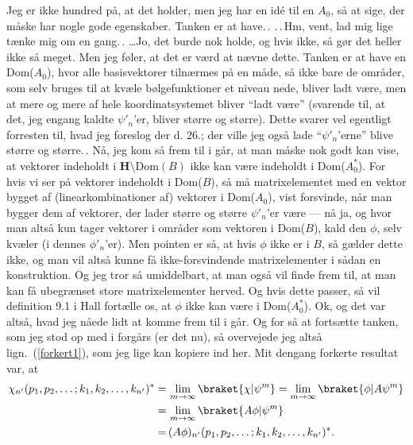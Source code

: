 \documentclass{report}
\begin{document}
Jeg er ikke hundred på, at det holder, men jeg har en idé til en $A_0$, så at sige, der måske har nogle gode egenskaber. Tanken er at have.\,. .\,.\,Hm, vent, lad mig lige tænke mig om en gang.\,. \ldots Jo, det burde nok holde, og hvis ikke, så gør det heller ikke så meget. Men jeg føler, at det er værd at nævne dette. Tanken er at have en Dom($A_0$), hvor alle basisvektorer tilnærmes på en måde, så ikke bare de områder, som selv bruges til at kvæle bølgefunktioner et niveau nede, bliver ladt være, men at mere og mere af hele koordinatsystemet bliver ``ladt være'' (svarende til, at det, jeg engang kaldte $\psi'_n$'er, bliver større og større). Dette svarer vel egentligt forresten til, hvad jeg foreslog der d. 26.; der ville jeg også lade ``$\psi'_n$'erne'' blive større og større.\,. Nå, jeg kom så frem til i går, at man måske nok godt kan vise, at vektorer indeholdt i $\mathrm{\textbf{H}} \setminus \mathrm{Dom}(B)$ ikke kan være indeholdt i Dom($A_0^*$). For hvis vi ser på vektorer indeholdt i Dom($B$), så må matrixelementet med en vektor bygget af (linearkombinationer af) vektorer i Dom($A_0$), vist forsvinde, når man bygger dem af vektorer, der lader større og større $\psi'_n$'er være --- nå ja, og hvor man altså kun tager vektorer i områder som vektoren i Dom($B$), kald den $\phi$, selv kvæler (i dennes $\phi'_n$'er). Men pointen er så, at hvis $\phi$ ikke er i $B$, så gælder dette ikke, og man vil altså kunne få ikke-forsvindende matrixelementer i sådan en konstruktion. Og jeg tror så umiddelbart, at man også vil finde frem til, at man kan få ubegrænset store matrixelementer herved. Og hvis dette passer, så vil definition 9.1 i Hall fortælle os, at $\phi$ ikke kan være i Dom($A_0^*$). Ok, og det var altså, hvad jeg nåede lidt at komme frem til i går. Og for så at fortsætte tanken, som jeg stod op med i forgårs (er det nu), så overvejede jeg altså lign.\ (\ref{forkert1}), som jeg lige kan kopiere ind her. Mit dengang forkerte resultat var, at
\begin{align}
\begin{aligned}
	\chi_{n'}(p_1, p_2, \ldots; k_1, k_2, \ldots, k_{n'})^* 
		=&\,
			\lim_{m\to\infty}\braket{\chi | \psi^m} = 
			\lim_{m\to\infty}\braket{\phi | A \psi^m} \\
		=&\, 
			\lim_{m\to\infty}\braket{A \phi | \psi^m} \\
		=&\, 
			(A \phi)_{n'}(p_1, p_2, \ldots; k_1, k_2, \ldots, k_{n'})^*.
\end{aligned}
\end{align}
\end{document}

